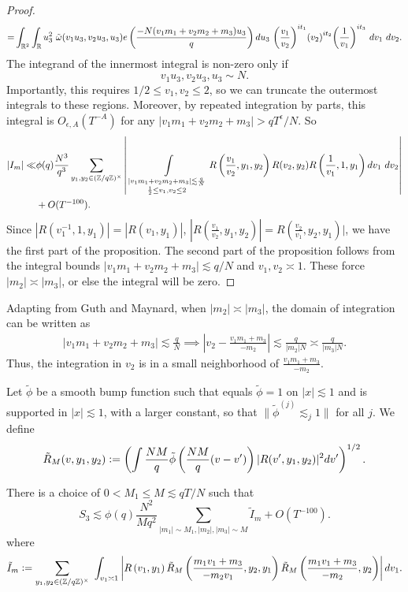 \begin{proof}
\begin{align*}
    =&\int_{\reals^2}\int_\reals u_3^2 \ \tilde{\omega}(v_1u_3,v_2u_3,u_3) e\left(\frac{-N(v_1m_1+v_2m_2+m_3)u_3}{q}\right)  du_3 \ {\left(\frac{v_1}{v_2}\right)}^{it_1} {\left(v_2\right)}^{it_2}{\left(\frac{1}{v_1}\right)}^{it_3}  \ dv_1\ dv_2.\\
\end{align*}
The integrand of the innermost integral is non-zero only if \[
    v_1u_3,v_2u_3,u_3\sim N.
\]
Importantly, this requires $1/2 \leq v_1,v_2 \leq 2$, so we can truncate the outermost integrals to these regions. Moreover, by repeated integration by parts, this integral is $O_{\epsilon, A}(T^{-A})$ for any $|v_1m_1+v_2m_2+m_3|>qT^\epsilon/N$.
So 
\begin{align*}
    |I_m|\ll &\phi(q) \frac{N^3}{q^3}  
    \sum_{y_1,y_2\in (\mathbb{Z}/q\mathbb{Z})^\times}\left|\ \int\displaylimits_{\substack{
        |v_1m_1+v_2m_2+m_3|\lesssim \frac{q}{N}\\
        \frac{1}{2}\leq v_1,v_2\leq 2
    }} R\left(\frac{v_1}{v_2},y_1,y_2\right)
    R(v_2,y_2)R\left(\frac{1}{v_1},1,y_1\right) dv_1 \ dv_2 \right|\\ &+ O(T^{-100}).\\
\end{align*}
Since $|R(v_1^{-1},1,y_1)|=|R(v_1,y_1)|$, $| R\left(\frac{v_1}{v_2},y_1,y_2\right)| = R\left(\frac{v_2}{v_1},y_2,y_1\right)|$, we have the first part of the proposition.
The second part of the proposition follows from the integral bounds $|v_1m_1+v_2m_2+m_3|\lesssim q/N$
 and $v_1,v_2\asymp 1$. These force $|m_2| \asymp|m_3|$, or else the integral will be zero.

\end{proof}

Adapting from Guth and Maynard, when $|m_2|\asymp|m_3|$, the domain of integration can be written as\begin{align*}
    |v_1m_1+v_2m_2+m_3|\lesssim \frac{q}{N} \implies \left|v_2 - \frac{v_1m_1+m_3}{-m_2}\right|\lesssim \frac{q}{|m_2|N} \asymp \frac{q}{|m_3|N}.
\end{align*}
Thus, the integration in $v_2$ is in a small neighborhood of $\frac{v_1m_1+m_3}{-m_2}$.

Let $\tilde{\phi}$ be a smooth bump function such that equals $\tilde{\phi}=1$ on $|x|\lesssim 1$ and is supported in $|x|\lesssim 1$, with a larger constant, so that $\|\tilde{\phi}^{(j)}\lesssim_j 1\|$ for all $j$. We define \[
\tilde{R}_M(v,y_1,y_2) \mathrel{\mathop:}= \left( \int \frac{NM}{q}\tilde{\phi}\left(\frac{NM}{q}(v-v')\right)|R(v',y_1,y_2)|^2 dv'\right)^{1/2}.
\]
\begin{proposition} \label{dyadics_3}
    There is a choice of $0<M_1\leq M \lesssim qT/N$ such that \[
        S_3\lesssim \phi(q)\frac{N^2}{Mq^2}\sum_{|m_1|\sim M_1,|m_2|,|m_3|\sim M}\tilde{I}_m+O(T^{-100}).
    \]
    where \[
    \tilde{I}_m\mathrel{\mathop:}= \sum_{y_1,y_2\in (\mathbb{Z}/q\mathbb{Z})^\times}\ \int_{v_1\asymp 1} 
         \left|R\left(v_1,y_1\right) \tilde{R}_M\left(\frac{m_1v_1+m_3}{-m_2v_1},y_2,y_1\right)
        \tilde{R}_M\left(\frac{m_1v_1+m_3}{-m_2},y_2\right)\right| dv_1.
    \]
\end{proposition}



